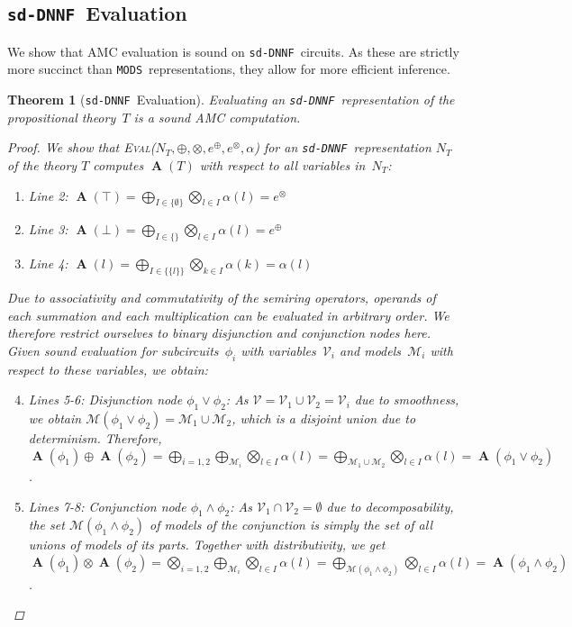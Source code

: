 \documentclass{article}
\theoremstyle{plain}
\newtheorem{theorem}{Theorem}
\theoremstyle{definition}
\newcommand{\sdDNNF}{{\tt sd-DNNF}}
\newcommand{\MODS}{{\tt MODS}}
\begin{document}
\subsection{\sdDNNF\ Evaluation}
We show that AMC evaluation is sound on \sdDNNF\ circuits.
As these are strictly more succinct than \MODS\ representations, they allow for
more efficient inference.
\begin{theorem}[\sdDNNF\ Evaluation]\label{th:sdDNNF}
  Evaluating an \sdDNNF\ representation of the propositional theory~$T$ is a sound AMC computation.
  \begin{proof}
  We show that \textsc{Eval}($N_T,\oplus,\otimes,e^{\oplus},e^{\otimes},\alpha$) for an \sdDNNF\
  representation $N_T$ of the theory $T$  computes
  $\operatorname{\mathbf{A}}(T)$ with respect to all variables
  in~$N_T$:
\begin{enumerate}
\item Line 2: 
  $\operatorname{\mathbf{A}}(\top) =
  \bigoplus_{I\in\{\emptyset\}}\bigotimes_{l\in I}\alpha(l) = e^{\otimes}$
 \item Line 3: 
  $\operatorname{\mathbf{A}}(\bot) =
  \bigoplus_{I\in \{\}}\bigotimes_{l\in I}\alpha(l) = e^{\oplus}$
\item Line 4: 
  $\operatorname{\mathbf{A}}(l) =
  \bigoplus_{I\in\{\{l\}\}}\bigotimes_{k\in I}\alpha(k) = \alpha(l)$
\end{enumerate}
Due to associativity and commutativity of the semiring
  operators, operands of each summation and each multiplication can be
  evaluated in arbitrary order. We therefore restrict ourselves to
  binary disjunction and conjunction nodes here. 
 Given sound evaluation for subcircuits~$\phi_i$
  with variables~$\mathcal{V}_i$ and models~$\mathcal{M}_i$ with
  respect to these variables, we obtain:
\begin{enumerate}
\setcounter{enumi}{3}
\item Lines 5-6:  
Disjunction node $\phi_1\vee\phi_2$: 
As  $\mathcal{V}=\mathcal{V}_1\cup\mathcal{V}_2 = \mathcal{V}_i$
due to smoothness, we obtain $\mathcal{M}(\phi_1\vee\phi_2) = 
\mathcal{M}_1\cup\mathcal{M}_2$, which is a disjoint union due to determinism. Therefore,
$\operatorname{\mathbf{A}}(\phi_1)\oplus
\operatorname{\mathbf{A}}(\phi_2) =
\bigoplus_{i=1,2}\bigoplus_{\mathcal{M}_i}\bigotimes_{l\in I}\alpha(l)
= \bigoplus_{\mathcal{M}_1\cup \mathcal{M}_2}\bigotimes_{l\in
  I}\alpha(l) = \operatorname{\mathbf{A}}(\phi_1\vee\phi_2)$.
\item Lines 7-8: 
Conjunction node $\phi_1\wedge\phi_2$: As
$\mathcal{V}_1\cap\mathcal{V}_2=\emptyset$ due to decomposability,
the set $\mathcal{M}(\phi_1\wedge\phi_2)$ of models of the conjunction
is simply the set of all unions of models of its parts. Together with distributivity, we get $\operatorname{\mathbf{A}}(\phi_1)\otimes
\operatorname{\mathbf{A}}(\phi_2) =
\bigotimes_{i=1,2}\bigoplus_{\mathcal{M}_i}\bigotimes_{l\in
  I}\alpha(l) = \bigoplus_{\mathcal{M}(\phi_1\wedge\phi_2)}\bigotimes_{l\in
  I}\alpha(l) = \operatorname{\mathbf{A}}(\phi_1\wedge\phi_2)$.
\end{enumerate}\end{proof}
\end{theorem}
\end{document}
